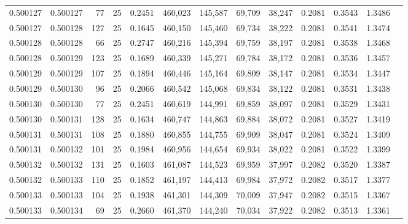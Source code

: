 \begin{tabular}{rrrrrrrrrrrrr}
0.500127 & 0.500127 &  77 &  25 &                                     0.2451 & 460,023 & 145,587 &  69,709 &  38,247 & 0.2081 & 0.3543 & 1.3486 \\
0.500127 & 0.500128 & 127 &  25 &                                     0.1645 & 460,150 & 145,460 &  69,734 &  38,222 & 0.2081 & 0.3541 & 1.3474 \\
0.500128 & 0.500128 &  66 &  25 &                                     0.2747 & 460,216 & 145,394 &  69,759 &  38,197 & 0.2081 & 0.3538 & 1.3468 \\
0.500128 & 0.500129 & 123 &  25 &                                     0.1689 & 460,339 & 145,271 &  69,784 &  38,172 & 0.2081 & 0.3536 & 1.3457 \\
0.500129 & 0.500129 & 107 &  25 &                                     0.1894 & 460,446 & 145,164 &  69,809 &  38,147 & 0.2081 & 0.3534 & 1.3447 \\
0.500129 & 0.500130 &  96 &  25 &                                     0.2066 & 460,542 & 145,068 &  69,834 &  38,122 & 0.2081 & 0.3531 & 1.3438 \\
0.500130 & 0.500130 &  77 &  25 &                                     0.2451 & 460,619 & 144,991 &  69,859 &  38,097 & 0.2081 & 0.3529 & 1.3431 \\
0.500130 & 0.500131 & 128 &  25 &                                     0.1634 & 460,747 & 144,863 &  69,884 &  38,072 & 0.2081 & 0.3527 & 1.3419 \\
0.500131 & 0.500131 & 108 &  25 &                                     0.1880 & 460,855 & 144,755 &  69,909 &  38,047 & 0.2081 & 0.3524 & 1.3409 \\
0.500131 & 0.500132 & 101 &  25 &                                     0.1984 & 460,956 & 144,654 &  69,934 &  38,022 & 0.2081 & 0.3522 & 1.3399 \\
0.500132 & 0.500132 & 131 &  25 &                                     0.1603 & 461,087 & 144,523 &  69,959 &  37,997 & 0.2082 & 0.3520 & 1.3387 \\
0.500132 & 0.500133 & 110 &  25 &                                     0.1852 & 461,197 & 144,413 &  69,984 &  37,972 & 0.2082 & 0.3517 & 1.3377 \\
0.500133 & 0.500133 & 104 &  25 &                                     0.1938 & 461,301 & 144,309 &  70,009 &  37,947 & 0.2082 & 0.3515 & 1.3367 \\
0.500133 & 0.500134 &  69 &  25 &                                     0.2660 & 461,370 & 144,240 &  70,034 &  37,922 & 0.2082 & 0.3513 & 1.3361 \\

\end{tabular}
